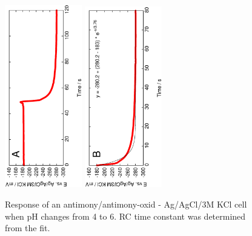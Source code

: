 \documentclass{beamer}
\begin{document}
\begin{frame}
\begin{figure}
\begin{center}
\includegraphics[width=0.3\textwidth, angle=-90]{transient.eps}

\includegraphics[width=0.3\textwidth, angle=-90]{transient_cut.eps}
\end{center}
\vspace{0.5cm}

Response of an antimony/antimony-oxid - Ag/AgCl/3M KCl cell when pH changes from 4 to 6. RC time constant was determined from the fit.

\label{fig:transient}
\end{figure}
\end{frame}
\end{document}

